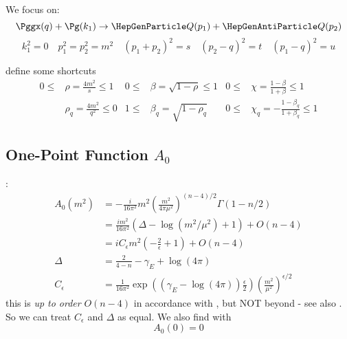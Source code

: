 We focus on:
\begin{equation}
\Pggx(q) + \Pg(k_1) \rightarrow \PQ(p_1)+\PaQ(p_2)
\end{equation}
\begin{equation}
k_1^2 = 0 \quad p_1^2 = p_2^2 = m^2 \quad (p_1+p_2)^2=s\quad (p_2-q)^2=t\quad (p_1-q)^2=u
\end{equation}

define some shortcuts
\begin{align}
0\leq&\rho = \frac {4m^2} s\leq 1 &0\leq&\beta = \sqrt{1-\rho}\leq 1 &0\leq&\chi = \frac{1-\beta}{1+\beta}\leq 1\\
&\rho_q = \frac {4m^2} {q^2}\leq 0 &1\leq&\beta_q = \sqrt{1-\rho_q} &0\leq&\chi_q = -\frac{1-\beta_q}{1+\beta_q}\leq 1
\end{align}

\subsection[One-Point Function A0]{One-Point Function $A_0$}
\cite{Denner:1991kt}:
\begin{align}
A_0(m^2)&=-\frac{i}{16\pi^2}m^2\left(\frac{m^2}{4\pi\mu^2}\right)^{(n-4)/2}\Gamma(1-n/2)\\
 &= \frac{im^2}{16\pi^2}\left(\Delta-\log(m^2/\mu^2)+1\right) + O(n-4)\\
 &= iC_\epsilon m^2 \left(-\frac 2 \epsilon+1\right) + O(n-4)\\
\Delta &= \frac 2 {4-n}-\gamma_E+\log(4\pi)\\
C_\epsilon &= \frac 1 {16\pi^2}\exp\left(\left(\gamma_E-\log(4\pi)\right)\frac{\epsilon} 2\right)\left(\frac{m^2}{\mu^2}\right)^{\epsilon/2}
\end{align}
this is \textit{up to order} $O(n-4)$ in accordance with \cite{Bojak:2000eu}\cite{PhysRevD.40.54}, but NOT beyond - see also \cite[eq. (A.12)]{Bojak:2000eu}. So we can treat $C_\epsilon$ and $\Delta$ as equal. We also find with \cite{Bojak:2000eu}
\begin{equation}
A_0(0)=0
\end{equation}

